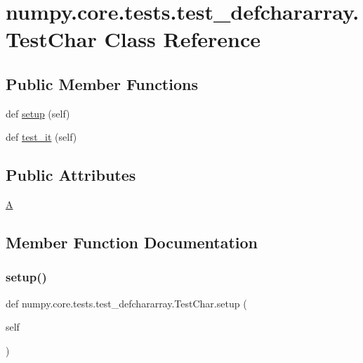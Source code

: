 \hypertarget{classnumpy_1_1core_1_1tests_1_1test__defchararray_1_1TestChar}{}\section{numpy.\+core.\+tests.\+test\+\_\+defchararray.\+Test\+Char Class Reference}
\label{classnumpy_1_1core_1_1tests_1_1test__defchararray_1_1TestChar}
\subsection*{Public Member Functions}
\begin{DoxyCompactItemize}
\item 
def \hyperlink{classnumpy_1_1core_1_1tests_1_1test__defchararray_1_1TestChar_ad447aaef1ff242d866df67d54af19b52}{setup} (self)
\item 
def \hyperlink{classnumpy_1_1core_1_1tests_1_1test__defchararray_1_1TestChar_a3fa78836b585931a1a910e109deea322}{test\+\_\+it} (self)
\end{DoxyCompactItemize}
\subsection*{Public Attributes}
\begin{DoxyCompactItemize}
\item 
\hyperlink{classnumpy_1_1core_1_1tests_1_1test__defchararray_1_1TestChar_a712163d20081a01838a695609ceb0144}{A}
\end{DoxyCompactItemize}


\subsection{Member Function Documentation}
\mbox{\label{classnumpy_1_1core_1_1tests_1_1test__defchararray_1_1TestChar_ad447aaef1ff242d866df67d54af19b52}} 
\subsubsection{\texorpdfstring{setup()}{setup()}}
{\footnotesize\ttfamily def numpy.\+core.\+tests.\+test\+\_\+defchararray.\+Test\+Char.\+setup (\begin{DoxyParamCaption}\item[{}]{self }\end{DoxyParamCaption})}

